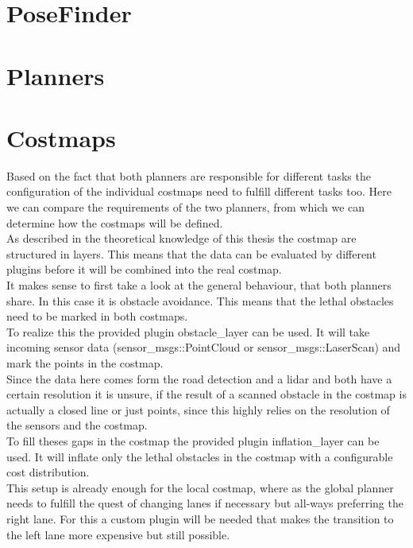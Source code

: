 \section{PoseFinder}
\section{Planners}
\section{Costmaps}
Based on the fact that both planners are responsible for different tasks the configuration of the individual costmaps need to fulfill different tasks too. Here we can compare the requirements of the two planners, from which we can determine how the costmaps will be defined.\\

As described in the theoretical knowledge of this thesis the costmap are structured in layers. This means that the data can be evaluated by different plugins before it will be combined into the real costmap.\\

It makes sense to first take a look at the general behaviour, that both planners share. In this case it is obstacle avoidance. This means that the lethal obstacles need to be marked in both costmaps.\\

To realize this the provided plugin obstacle\_layer can be used. It will take incoming sensor data (sensor\_msgs::PointCloud or sensor\_msgs::LaserScan) and mark the points in the costmap.\\

Since the data here comes form the road detection and a lidar and both have a certain resolution it is unsure, if the result of a scanned obstacle in the costmap is actually a closed line or just points, since this highly relies on the resolution of the sensors and the costmap.\\

To fill theses gaps in the costmap the provided plugin inflation\_layer can be used. It will inflate only the lethal obstacles in the costmap with a configurable cost distribution.\\

This setup is already enough for the local costmap, where as the global planner needs to fulfill the quest of changing lanes if necessary but all-ways preferring the right lane. For this a custom plugin will be needed that makes the transition to the left lane more expensive but still possible.

